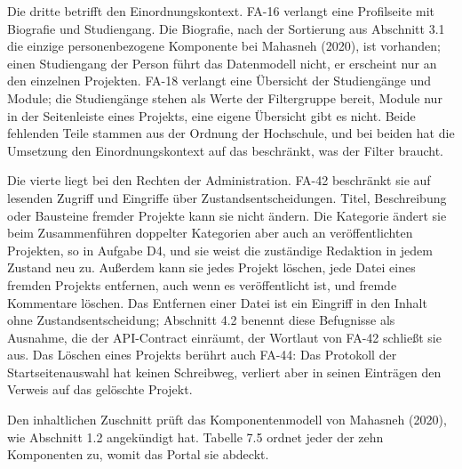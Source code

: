 Die dritte betrifft den Einordnungskontext. FA-16 verlangt eine Profilseite mit Biografie und Studiengang. Die Biografie, nach der Sortierung aus Abschnitt 3.1 die einzige personenbezogene Komponente bei Mahasneh (2020), ist vorhanden; einen Studiengang der Person führt das Datenmodell nicht, er erscheint nur an den einzelnen Projekten. FA-18 verlangt eine Übersicht der Studiengänge und Module; die Studiengänge stehen als Werte der Filtergruppe bereit, Module nur in der Seitenleiste eines Projekts, eine eigene Übersicht gibt es nicht. Beide fehlenden Teile stammen aus der Ordnung der Hochschule, und bei beiden hat die Umsetzung den Einordnungskontext auf das beschränkt, was der Filter braucht.

Die vierte liegt bei den Rechten der Administration. FA-42 beschränkt sie auf lesenden Zugriff und Eingriffe über Zustandsentscheidungen. Titel, Beschreibung oder Bausteine fremder Projekte kann sie nicht ändern. Die Kategorie ändert sie beim Zusammenführen doppelter Kategorien aber auch an veröffentlichten Projekten, so in Aufgabe D4, und sie weist die zuständige Redaktion in jedem Zustand neu zu. Außerdem kann sie jedes Projekt löschen, jede Datei eines fremden Projekts entfernen, auch wenn es veröffentlicht ist, und fremde Kommentare löschen. Das Entfernen einer Datei ist ein Eingriff in den Inhalt ohne Zustandsentscheidung; Abschnitt 4.2 benennt diese Befugnisse als Ausnahme, die der API-Contract einräumt, der Wortlaut von FA-42 schließt sie aus. Das Löschen eines Projekts berührt auch FA-44: Das Protokoll der Startseitenauswahl hat keinen Schreibweg, verliert aber in seinen Einträgen den Verweis auf das gelöschte Projekt.

Den inhaltlichen Zuschnitt prüft das Komponentenmodell von Mahasneh (2020), wie Abschnitt 1.2 angekündigt hat. Tabelle 7.5 ordnet jeder der zehn Komponenten zu, womit das Portal sie abdeckt.


